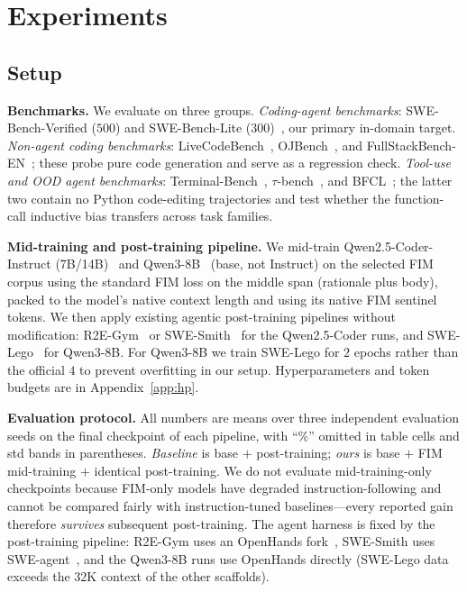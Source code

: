 
\section{Experiments}
\label{sec:exp}
\vspace{-0.5ex}

\subsection{Setup}
\label{sec:exp:setup}

\textbf{Benchmarks.} We evaluate on three groups.
\emph{Coding-agent benchmarks}: SWE-Bench-Verified ($500$) and
SWE-Bench-Lite ($300$)~\citep{swebench}, our primary in-domain target.
\emph{Non-agent coding benchmarks}: LiveCodeBench~\citep{livecodebench},
OJBench~\citep{ojbench}, and FullStackBench-EN~\citep{fullstackbench};
these probe pure code generation and serve as a regression check.
\emph{Tool-use and OOD agent benchmarks}: Terminal-Bench~\citep{terminalbench},
$\tau$-bench~\citep{taubench}, and BFCL~\citep{bfcl}; the latter two
contain no Python code-editing trajectories and test whether the
function-call inductive bias transfers across task families.

\textbf{Mid-training and post-training pipeline.}
We mid-train Qwen2.5-Coder-Instruct (7B/14B)~\citep{qwencoder} and
Qwen3-8B~\citep{qwen3} (base, not Instruct) on the selected FIM corpus
using the standard FIM loss on the middle span
(rationale plus body), packed to the model's native context length and
using its native FIM sentinel tokens. We then apply existing agentic
post-training pipelines without modification:
R2E-Gym~\citep{r2egym} or SWE-Smith~\citep{swesmith} for the
Qwen2.5-Coder runs, and SWE-Lego~\citep{swelego} for Qwen3-8B. For
Qwen3-8B we train SWE-Lego for $2$ epochs rather than the official $4$
to prevent overfitting in our setup. Hyperparameters and token budgets
are in Appendix~\ref{app:hp}.

\textbf{Evaluation protocol.}
All numbers are means over three independent evaluation seeds on the
final checkpoint of each pipeline, with ``\%'' omitted in table cells
and std bands in parentheses. \emph{Baseline} is base $+$ post-training;
\emph{ours} is base $+$ FIM mid-training $+$ identical post-training.
We do not evaluate mid-training-only checkpoints because FIM-only models
have degraded instruction-following and cannot be compared fairly with
instruction-tuned baselines---every reported gain therefore
\emph{survives} subsequent post-training. The agent harness is fixed by
the post-training pipeline: R2E-Gym uses an OpenHands fork~\citep{openhands,
r2egym}, SWE-Smith uses SWE-agent~\citep{sweagent}, and the Qwen3-8B
runs use OpenHands directly (SWE-Lego data exceeds the 32K context of
the other scaffolds).

